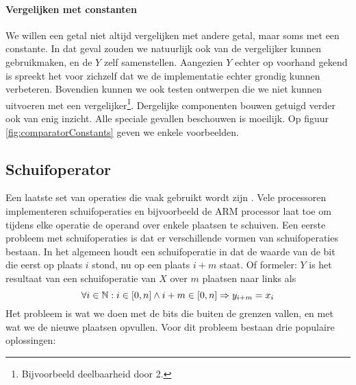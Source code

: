 \paragraph{Vergelijken met constanten}
We willen een getal niet altijd vergelijken met andere getal, maar soms met een constante. In dat geval zouden we natuurlijk ook van de vergelijker kunnen gebruikmaken, en de $Y$ zelf samenstellen. Aangezien $Y$ echter op voorhand gekend is spreekt het voor zichzelf dat we de implementatie echter grondig kunnen verbeteren. Bovendien kunnen we ook testen ontwerpen die we niet kunnen uitvoeren met een vergelijker\footnote{Bijvoorbeeld deelbaarheid door 2.}. Dergelijke componenten bouwen getuigd verder ook van enig inzicht. Alle speciale gevallen beschouwen is moeilijk. Op figuur \ref{fig:comparatorConstants} geven we enkele voorbeelden.
\subsection{Schuifoperator}
\label{ss:shiftoperators}
Een laatste set van operaties die vaak gebruikt wordt zijn . Vele processoren implementeren schuifoperaties en bijvoorbeeld de ARM processor laat toe om tijdens elke operatie de operand over enkele plaatsen te schuiven. Een eerste probleem met schuifoperaties is dat er verschillende vormen van schuifoperaties bestaan. In het algemeen houdt een schuifoperatie in dat de waarde van de bit die eerst op plaats $i$ stond, nu op een plaats $i+m$ staat. Of formeler: $Y$ is het resultaat van een schuifoperatie van $X$ over $m$ plaatsen naar links als
\begin{equation}
\forall i\in\mathbb{N}:i\in\left[0,n\right]\wedge i+m\in\left[0,n\right]\Rightarrow y_{i+m}=x_i
\end{equation}
Het probleem is wat we doen met de bits die buiten de grenzen vallen, en met wat we de nieuwe plaatsen opvullen. Voor dit probleem bestaan drie populaire oplossingen:
